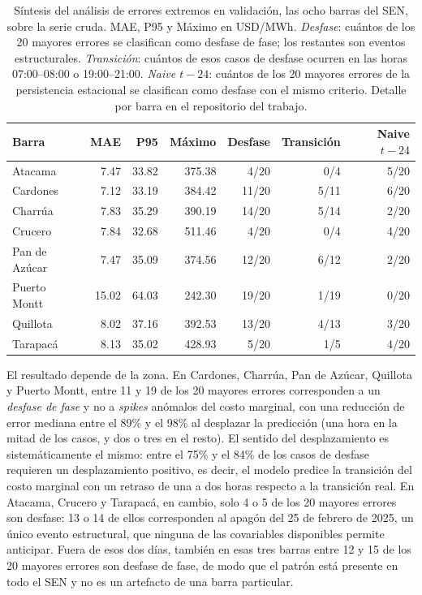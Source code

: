 \begin{table}[htbp]
    \centering
    \small
    \setlength{\tabcolsep}{4pt}
    \begin{tabular}{lrrrrrr}
        \toprule
        Barra & MAE & P95 & Máximo & Desfase & Transición & Naive $t-24$ \\
        \midrule
        Atacama       & 7.47  & 33.82 & 375.38 &  4/20 & 0/4  & 5/20 \\
        Cardones      & 7.12  & 33.19 & 384.42 & 11/20 & 5/11 & 6/20 \\
        Charrúa       & 7.83  & 35.29 & 390.19 & 14/20 & 5/14 & 2/20 \\
        Crucero       & 7.84  & 32.68 & 511.46 &  4/20 & 0/4  & 4/20 \\
        Pan de Azúcar & 7.47  & 35.09 & 374.56 & 12/20 & 6/12 & 2/20 \\
        Puerto Montt  & 15.02 & 64.03 & 242.30 & 19/20 & 1/19 & 0/20 \\
        Quillota      & 8.02  & 37.16 & 392.53 & 13/20 & 4/13 & 3/20 \\
        Tarapacá      & 8.13  & 35.02 & 428.93 &  5/20 & 1/5  & 4/20 \\
        \bottomrule
    \end{tabular}
    \vspace{0.2cm}
    \caption{Síntesis del análisis de errores extremos en validación, las ocho barras del SEN, sobre la serie cruda. MAE, P95 y Máximo en USD/MWh. \textit{Desfase}: cuántos de los 20 mayores errores se clasifican como desfase de fase; los restantes son eventos estructurales. \textit{Transición}: cuántos de esos casos de desfase ocurren en las horas 07:00--08:00 o 19:00--21:00. \textit{Naive $t-24$}: cuántos de los 20 mayores errores de la persistencia estacional se clasifican como desfase con el mismo criterio. Detalle por barra en el repositorio del trabajo.}
    \label{tab:sintesis_errores}
\end{table}

El resultado depende de la zona. En Cardones, Charrúa, Pan de Azúcar, Quillota y Puerto Montt, entre 11 y 19 de los 20 mayores errores corresponden a un \textit{desfase de fase} y no a \textit{spikes} anómalos del costo marginal, con una reducción de error mediana entre el 89\% y el 98\% al desplazar la predicción (una hora en la mitad de los casos, y dos o tres en el resto). El sentido del desplazamiento es sistemáticamente el mismo: entre el 75\% y el 84\% de los casos de desfase requieren un desplazamiento positivo, es decir, el modelo predice la transición del costo marginal con un retraso de una a dos horas respecto a la transición real. En Atacama, Crucero y Tarapacá, en cambio, solo 4 o 5 de los 20 mayores errores son desfase: 13 o 14 de ellos corresponden al apagón del 25 de febrero de 2025, un único evento estructural, que ninguna de las covariables disponibles permite anticipar. Fuera de esos dos días, también en esas tres barras entre 12 y 15 de los 20 mayores errores son desfase de fase, de modo que el patrón está presente en todo el SEN y no es un artefacto de una barra particular.

